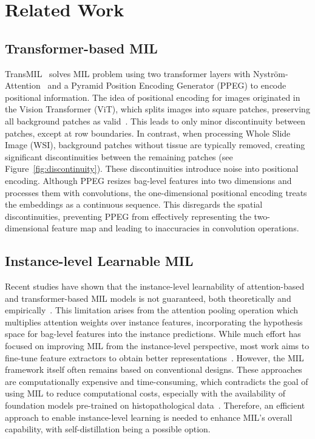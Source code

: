 \section{Related Work}
\subsection{Transformer-based MIL}
TransMIL~\cite{shao2021transmil} solves MIL problem using two transformer layers with Nyström-Attention~\cite{xiong2021nystrom} and a Pyramid Position Encoding Generator (PPEG) to encode positional information. The idea of positional encoding for images originated in the Vision Transformer (ViT), which splits images into square patches, preserving all background patches as valid~\cite{dosovitskiy2021vit}. This leads to only minor discontinuity between patches, except at row boundaries. In contrast, when processing Whole Slide Image (WSI), background patches without tissue are typically removed, creating significant discontinuities between the remaining patches (see Figure~\ref{fig:discontinuity}). These discontinuities introduce noise into positional encoding. Although PPEG resizes bag-level features into two dimensions and processes them with convolutions, the one-dimensional positional encoding treats the embeddings as a continuous sequence. This disregards the spatial discontinuities, preventing PPEG from effectively representing the two-dimensional feature map and leading to inaccuracies in convolution operations.

\subsection{Instance-level Learnable MIL}
Recent studies have shown that the instance-level learnability of attention-based and transformer-based MIL models is not guaranteed, both theoretically and empirically~\cite{jang2024learnability}. This limitation arises from the attention pooling operation which multiplies attention weights over instance features, incorporating the hypothesis space for bag-level features into the instance predictions. While much effort has focused on improving MIL from the instance-level perspective, most work aims to fine-tune feature extractors to obtain better representations~\cite{liu2023multiple, lin2023interventional, huang2024hnm}. However, the MIL framework itself often remains based on conventional designs. These approaches are computationally expensive and time-consuming, which contradicts the goal of using MIL to reduce computational costs, especially with the availability of foundation models pre-trained on histopathological data~\cite{wang2021transpath, wang2022ctrans, xu2024gigapath, chen2024uni, vorontsov2024virchow}. Therefore, an efficient approach to enable instance-level learning is needed to enhance MIL’s overall capability, with self-distillation being a possible option.

